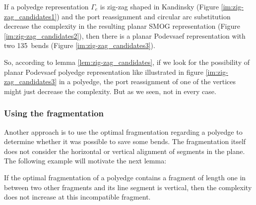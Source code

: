 \begin{lemma}If a polyedge representation $\Gamma_e$ is zig-zag shaped in Kandinsky (Figure \ref{im:zig-zag_candidates1}) and the port reassignment and circular arc substitution decrease the complexity in the resulting planar SMOG representation (Figure \ref{im:zig-zag_candidates2}), then there is a planar Podevsaef representation with two 135\degree~bends (Figure \ref{im:zig-zag_candidates3}).\label{lem:zig-zag_candidates}
\end{lemma}
So, according to lemma \ref{lem:zig-zag_candidates}, if we look for the possibility of planar Podevsaef polyedge representation like illustrated in figure \ref{im:zig-zag_candidates3} in a polyedge, the port reassignment of one of the vertices might just decrease the complexity. But as we seen, not in every case.
\subsubsection{Using the fragmentation}
Another approach is to use the optimal fragmentation regarding a polyedge to determine whether it was possible to save some bends. The fragmentation itself does not consider the horizontal or vertical alignment of segments in the plane. The following example will motivate the next lemma:
\begin{lemma}
	If the optimal fragmentation of a polyedge contains a fragment of length one in between two other fragments and its line segment is vertical, then the complexity does not increase at this incompatible fragment.
\end{lemma}

